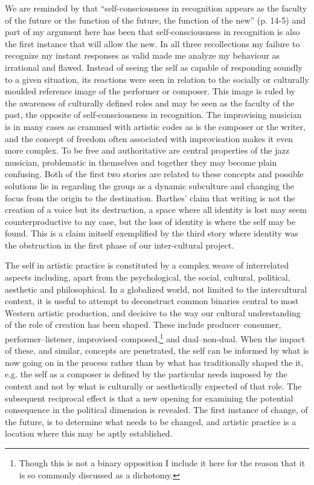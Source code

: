 \documentclass[a4paper]{article}
\begin{document}
We are reminded by \citet{deleuze94} that ``self-consciousness in recognition appears as the faculty of the future or the function of the future, the function of the new'' (p. 14-5) and part of my argument here has been that self-consciousness in recognition is also the first instance that will allow the new. In all three recollections my failure to recognize my instant responses as valid made me analyze my behaviour as irrational and flawed. Instead of seeing the self as capable of responding soundly to a given situation, its reactions were seen in relation to the socially or culturally moulded reference image of the performer or composer. This image is ruled  by the awareness of culturally defined roles and may be seen as the faculty of the past, the opposite of self-consciousness in recognition. The improvising musician is in many cases as crammed with artistic codes as is the composer or the writer, and the concept of freedom often associated with improvisation makes it even more complex. To be free and authoritative are central properties of the jazz musician, problematic in themselves and together they may become plain confusing. Both of the first two stories are related to these concepts and possible solutions lie in regarding the group as a dynamic subculture and changing the focus from the origin to the destination. Barthes' claim that writing is not the creation of a voice but its destruction, a space where all identity is lost may seem counterproductive to my case, but the loss of identity is where the self may be found. This is a claim initself exemplified by the third story where identity was the obstruction in the first phase of our inter-cultural project.

The self in artistic practice is constituted by a complex weave of interrelated aspects including, apart from the psychological, the social, cultural, political, aesthetic and philosophical. In a globalized world, not limited to the intercultural context, it is useful to attempt to deconstruct common binaries central to most Western artistic production, and decisive to the way our cultural understanding of the role of creation has been shaped. These include producer--consumer, performer--listener, improvised--composed,\footnote{Though this is not a binary opposition I include it here for the reason that it is so commonly discussed as a dichotomy.} and dual--non-dual. When the impact of these, and similar, concepts are penetrated, the self can be informed by what is now going on in the process rather than by what has traditionally shaped the it, e.g. the self as a composer is defined by the particular needs imposed by the context and not by what is culturally or aesthetically expected of that role. The subsequent reciprocal effect is that a new opening for examining the potential consequence in the political dimension is revealed. The first instance of change, of the future, is to determine what needs to be changed, and artistic practice is a location where this may be aptly established.
\end{document}
